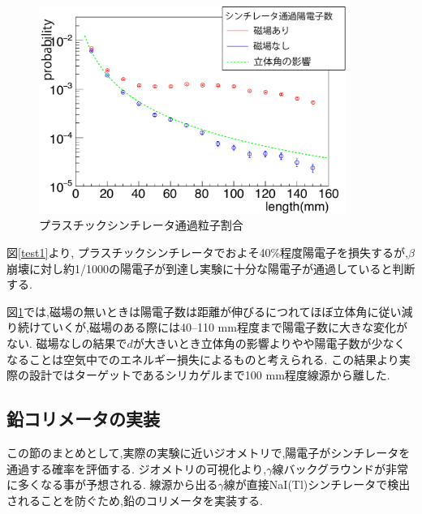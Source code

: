 \begin{figure}[htbp]
	\centering
		\includegraphics[width=10cm]{fig/scinti_test.pdf}
	\caption{プラスチックシンチレータ通過粒子割合}
	\label{scinti_test}
\end{figure}


図\ref{test1}より, プラスチックシンチレータでおよそ40\%程度陽電子を損失するが,$\beta$崩壊に対し約1/1000の陽電子が到達し実験に十分な陽電子が通過していると判断する.

図\ref{scinti_test}では,磁場の無いときは陽電子数は距離が伸びるにつれてほぼ立体角に従い減り続けていくが,磁場のある際には40--110 mm程度まで陽電子数に大きな変化がない.
磁場なしの結果で$d$が大きいとき立体角の影響よりやや陽電子数が少なくなることは空気中でのエネルギー損失によるものと考えられる.
この結果より実際の設計ではターゲットであるシリカゲルまで100 mm程度線源から離した.

\subsection{鉛コリメータの実装}
この節のまとめとして,実際の実験に近いジオメトリで,陽電子がシンチレータを通過する確率を評価する.
ジオメトリの可視化より,$\gamma$線バックグラウンドが非常に多くなる事が予想される.
線源から出る$\gamma$線が直接NaI(Tl)シンチレータで検出されることを防ぐため,鉛のコリメータを実装する.

